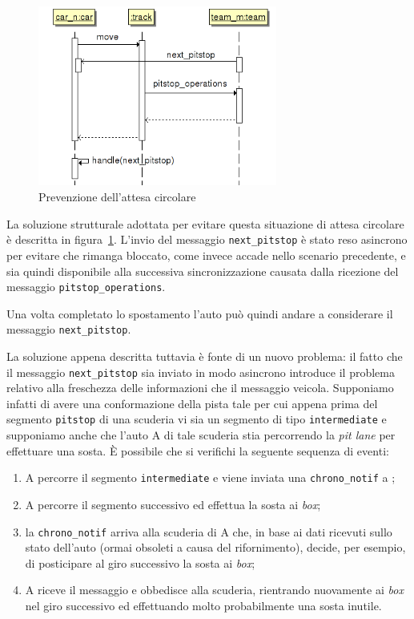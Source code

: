 \begin{figure}
\begin{center}
\includegraphics[width=0.7\textwidth]{diagrammi/PitstopSolution}
\caption{Prevenzione dell'attesa circolare}
\label{fig:pitstopSol}
\end{center}
\end{figure}

La soluzione strutturale adottata per evitare questa situazione di attesa circolare è descritta in figura~\ref{fig:pitstopSol}. L'invio del messaggio \texttt{next\_pitstop} è stato reso asincrono per evitare che \team{} rimanga bloccato, come invece accade nello scenario precedente, e sia quindi disponibile alla successiva sincronizzazione causata dalla ricezione del messaggio \texttt{pitstop\_operations}.

Una volta completato lo spostamento l'auto può quindi andare a considerare il messaggio \texttt{next\_pitstop}.

La soluzione appena descritta tuttavia è fonte di un nuovo problema: il fatto che il messaggio \texttt{next\_pitstop} sia inviato in modo asincrono introduce il problema relativo alla freschezza delle informazioni che il messaggio veicola. Supponiamo infatti di avere una conformazione della pista tale per cui appena prima del segmento \texttt{pitstop} di una scuderia vi sia un segmento di tipo \texttt{intermediate} e supponiamo anche che l'auto A di tale scuderia stia percorrendo la \textit{pit lane} per effettuare una sosta.
\`E possibile che si verifichi la seguente sequenza di eventi:
\begin{enumerate}
\item A percorre il segmento \texttt{intermediate} e viene inviata una \texttt{chrono\_notif} a \evdisp{};
\item A percorre il segmento successivo ed effettua la sosta ai \textit{box};
\item la \texttt{chrono\_notif} arriva alla scuderia di A che, in base ai dati ricevuti sullo stato dell'auto (ormai obsoleti a causa del rifornimento), decide, per esempio, di posticipare al giro successivo la sosta ai \textit{box};
\item A riceve il messaggio e obbedisce alla scuderia, rientrando nuovamente ai \textit{box} nel giro successivo ed effettuando molto probabilmente una sosta inutile.
\end{enumerate}

